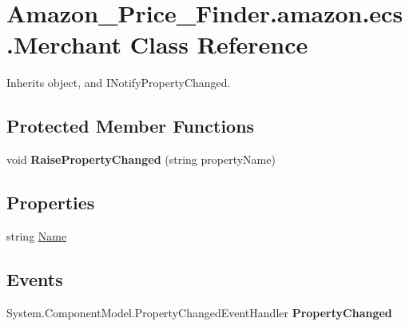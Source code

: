 \hypertarget{class_amazon___price___finder_1_1amazon_1_1ecs_1_1_merchant}{\section{Amazon\-\_\-\-Price\-\_\-\-Finder.\-amazon.\-ecs.\-Merchant Class Reference}
\label{class_amazon___price___finder_1_1amazon_1_1ecs_1_1_merchant}
}


 




Inherits object, and I\-Notify\-Property\-Changed.

\subsection*{Protected Member Functions}
\begin{DoxyCompactItemize}
\item 
\hypertarget{class_amazon___price___finder_1_1amazon_1_1ecs_1_1_merchant_ac8450d176778f49a4941b32b31665ec0}{void {\bfseries Raise\-Property\-Changed} (string property\-Name)}\label{class_amazon___price___finder_1_1amazon_1_1ecs_1_1_merchant_ac8450d176778f49a4941b32b31665ec0}

\end{DoxyCompactItemize}
\subsection*{Properties}
\begin{DoxyCompactItemize}
\item 
\hypertarget{class_amazon___price___finder_1_1amazon_1_1ecs_1_1_merchant_ac4da71064210d9a44b5eb248a65638c9}{string \hyperlink{class_amazon___price___finder_1_1amazon_1_1ecs_1_1_merchant_ac4da71064210d9a44b5eb248a65638c9}{Name}}\label{class_amazon___price___finder_1_1amazon_1_1ecs_1_1_merchant_ac4da71064210d9a44b5eb248a65638c9}

\begin{DoxyCompactList}\small\item\em \end{DoxyCompactList}\end{DoxyCompactItemize}
\subsection*{Events}
\begin{DoxyCompactItemize}
\item 
\hypertarget{class_amazon___price___finder_1_1amazon_1_1ecs_1_1_merchant_ac21c6e8fea1902c26333990b54901b8c}{System.\-Component\-Model.\-Property\-Changed\-Event\-Handler {\bfseries Property\-Changed}}\label{class_amazon___price___finder_1_1amazon_1_1ecs_1_1_merchant_ac21c6e8fea1902c26333990b54901b8c}

\end{DoxyCompactItemize}


